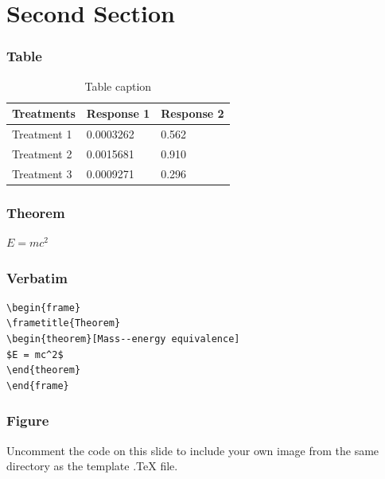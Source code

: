 \documentclass{beamer}
\begin{document}
\section{Second Section}

\begin{frame}
\frametitle{Table}
\begin{table}
\begin{tabular}{l l l}
\toprule
\textbf{Treatments} & \textbf{Response 1} & \textbf{Response 2}\\
\midrule
Treatment 1 & 0.0003262 & 0.562 \\
Treatment 2 & 0.0015681 & 0.910 \\
Treatment 3 & 0.0009271 & 0.296 \\
\bottomrule
\end{tabular}
\caption{Table caption}
\end{table}
\end{frame}


\begin{frame}
\frametitle{Theorem}
\begin{theorem}
$E = mc^2$
\end{theorem}
\end{frame}


\begin{frame}[fragile] %
\frametitle{Verbatim}
\begin{example}
\begin{verbatim}
\begin{frame}
\frametitle{Theorem}
\begin{theorem}[Mass--energy equivalence]
$E = mc^2$
\end{theorem}
\end{frame}\end{verbatim}
\end{example}
\end{frame}


\begin{frame}
\frametitle{Figure}
Uncomment the code on this slide to include your own image from the same directory as the template .TeX file.
\end{frame}
\end{document}
